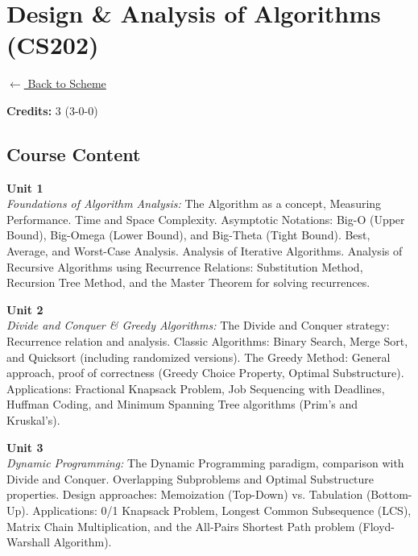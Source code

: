 \section*{Design \& Analysis of Algorithms (CS202)}
\label{course:CS202}

\noindent \small{\hyperref[main:scheme]{$\leftarrow$ Back to Scheme}} \vspace{0.5cm}

\noindent \textbf{Credits:} 3 (3-0-0)

\subsection*{Course Content}
\noindent\textbf{Unit 1} \\
\textit{Foundations of Algorithm Analysis:} The Algorithm as a concept, Measuring Performance. Time and Space Complexity. Asymptotic Notations: Big-O (Upper Bound), Big-Omega (Lower Bound), and Big-Theta (Tight Bound). Best, Average, and Worst-Case Analysis. Analysis of Iterative Algorithms. Analysis of Recursive Algorithms using Recurrence Relations: Substitution Method, Recursion Tree Method, and the Master Theorem for solving recurrences.

\vspace{0.3cm}

\noindent\textbf{Unit 2} \\
\textit{Divide and Conquer \& Greedy Algorithms:} The Divide and Conquer strategy: Recurrence relation and analysis. Classic Algorithms: Binary Search, Merge Sort, and Quicksort (including randomized versions). The Greedy Method: General approach, proof of correctness (Greedy Choice Property, Optimal Substructure). Applications: Fractional Knapsack Problem, Job Sequencing with Deadlines, Huffman Coding, and Minimum Spanning Tree algorithms (Prim's and Kruskal's).

\vspace{0.3cm}

\noindent\textbf{Unit 3} \\
\textit{Dynamic Programming:} The Dynamic Programming paradigm, comparison with Divide and Conquer. Overlapping Subproblems and Optimal Substructure properties. Design approaches: Memoization (Top-Down) vs. Tabulation (Bottom-Up). Applications: 0/1 Knapsack Problem, Longest Common Subsequence (LCS), Matrix Chain Multiplication, and the All-Pairs Shortest Path problem (Floyd-Warshall Algorithm).

